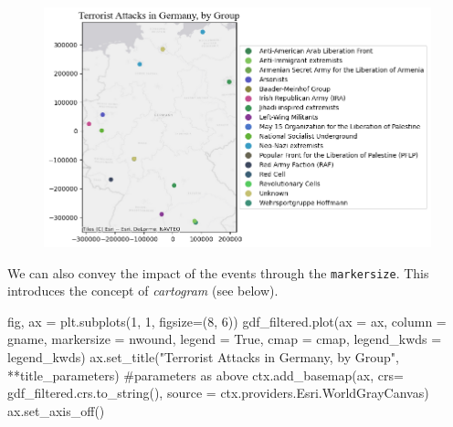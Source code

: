 \documentclass[
  letterpaper,
  DIV=11,
  numbers=noendperiod]{scrreprt}
\newenvironment{Shaded}{\begin{snugshade}}{\end{snugshade}}
\newcommand{\CommentTok}[1]{\textcolor[rgb]{0.37,0.37,0.37}{#1}}
\newcommand{\DecValTok}[1]{\textcolor[rgb]{0.68,0.00,0.00}{#1}}
\newcommand{\NormalTok}[1]{\textcolor[rgb]{0.00,0.23,0.31}{#1}}
\newcommand{\OperatorTok}[1]{\textcolor[rgb]{0.37,0.37,0.37}{#1}}
\newcommand{\StringTok}[1]{\textcolor[rgb]{0.13,0.47,0.30}{#1}}
\newcommand{\VariableTok}[1]{\textcolor[rgb]{0.07,0.07,0.07}{#1}}
\begin{document}
\begin{figure}[H]

{\centering \includegraphics{labs/w02_maps_files/figure-pdf/cell-47-output-1.png}

}

\end{figure}

We can also convey the impact of the events through the
\texttt{markersize}. This introduces the concept of \emph{cartogram}
(see below).

\begin{Shaded}
\begin{Highlighting}[]
\NormalTok{fig, ax }\OperatorTok{=}\NormalTok{ plt.subplots(}\DecValTok{1}\NormalTok{, }\DecValTok{1}\NormalTok{, figsize}\OperatorTok{=}\NormalTok{(}\DecValTok{8}\NormalTok{, }\DecValTok{6}\NormalTok{))}
\NormalTok{gdf\_filtered.plot(ax }\OperatorTok{=}\NormalTok{ ax, column }\OperatorTok{=} \StringTok{\textquotesingle{}gname\textquotesingle{}}\NormalTok{, markersize }\OperatorTok{=} \StringTok{\textquotesingle{}nwound\textquotesingle{}}\NormalTok{, legend }\OperatorTok{=} \VariableTok{True}\NormalTok{, cmap }\OperatorTok{=}\NormalTok{ cmap, legend\_kwds }\OperatorTok{=}\NormalTok{ legend\_kwds)}
\NormalTok{ax.set\_title(}\StringTok{"Terrorist Attacks in Germany, by Group"}\NormalTok{, }\OperatorTok{**}\NormalTok{title\_parameters) }\CommentTok{\#parameters as above}
\NormalTok{ctx.add\_basemap(ax, crs}\OperatorTok{=}\NormalTok{ gdf\_filtered.crs.to\_string(), source }\OperatorTok{=}\NormalTok{ ctx.providers.Esri.WorldGrayCanvas)}
\NormalTok{ax.set\_axis\_off()}
\end{Highlighting}
\end{Shaded}
\end{document}
